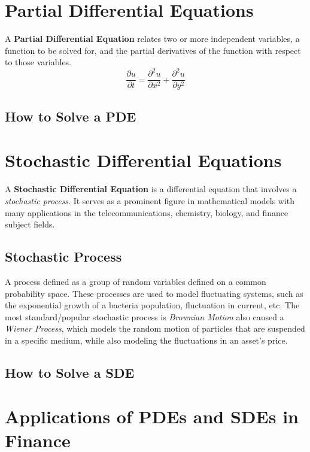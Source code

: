 \documentclass{article}
\begin{document}
\section{Partial Differential Equations}
A \textbf{Partial Differential Equation} relates two or more independent variables, a function to be solved for, and the partial derivatives of the function with respect to those variables. 
$$\frac{\partial u}{\partial t} = \frac{\partial^2 u}{\partial x^2} + \frac{\partial^2 u}{\partial y^2}  $$
\subsection{How to Solve a PDE}

\section{Stochastic Differential Equations}
A \textbf{Stochastic Differential Equation} is a differential equation that involves a \textit{stochastic process}. It serves as a prominent figure in mathematical models with many applications in the telecommunications, chemistry, biology, and finance subject fields. 

\subsection{Stochastic Process}
A process defined as a group of random variables defined on a common probability space. These processes are used to model fluctuating systems, such as the exponential growth of a bacteria population, fluctuation in current, etc. The most standard/popular stochastic process is  \textit{Brownian Motion} also caused a \textit{Wiener Process}, which models the random motion of particles that are suspended in a specific medium, while also modeling the fluctuations in an asset's price. 
\subsection{How to Solve a SDE}

\section{Applications of PDEs and SDEs in Finance}
\end{document}

